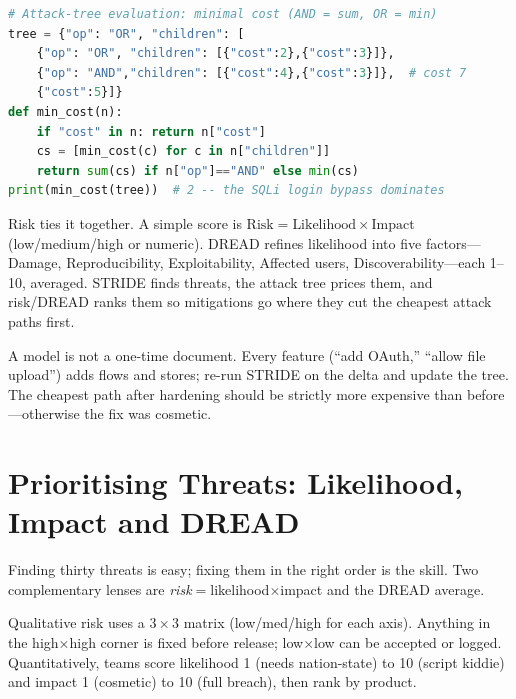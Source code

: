 \begin{lstlisting}[language=Python]
# Attack-tree evaluation: minimal cost (AND = sum, OR = min)
tree = {"op": "OR", "children": [
    {"op": "OR", "children": [{"cost":2},{"cost":3}]},
    {"op": "AND","children": [{"cost":4},{"cost":3}]},  # cost 7
    {"cost":5}]}
def min_cost(n):
    if "cost" in n: return n["cost"]
    cs = [min_cost(c) for c in n["children"]]
    return sum(cs) if n["op"]=="AND" else min(cs)
print(min_cost(tree))  # 2 -- the SQLi login bypass dominates
\end{lstlisting}

Risk ties it together. A simple score is $\text{Risk}=\text{Likelihood}\times\text{Impact}$ (low/medium/high or numeric). DREAD refines likelihood into five factors---Damage, Reproducibility, Exploitability, Affected users, Discoverability---each 1--10, averaged. STRIDE finds threats, the attack tree prices them, and risk/DREAD ranks them so mitigations go where they cut the cheapest attack paths first.

\begin{remark}
A model is not a one-time document. Every feature (``add OAuth,'' ``allow file upload'') adds flows and stores; re-run STRIDE on the delta and update the tree. The cheapest path after hardening should be strictly more expensive than before---otherwise the fix was cosmetic.
\end{remark}

\section{Prioritising Threats: Likelihood, Impact and DREAD}
\label{sec:dread}
Finding thirty threats is easy; fixing them in the right order is the skill. Two complementary lenses are \emph{risk}$=$likelihood$\times$impact and the DREAD average.

Qualitative risk uses a $3\times3$ matrix (low/med/high for each axis). Anything in the high$\times$high corner is fixed before release; low$\times$low can be accepted or logged. Quantitatively, teams score likelihood 1 (needs nation-state) to 10 (script kiddie) and impact 1 (cosmetic) to 10 (full breach), then rank by product.

